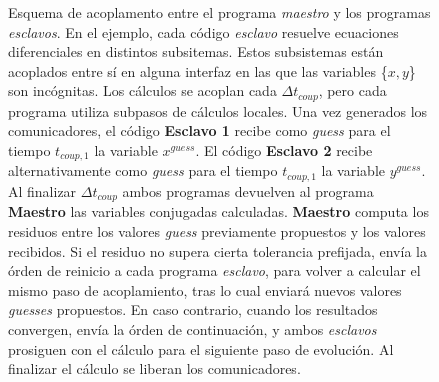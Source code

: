 \begin{figure}
\caption[Esquema de acoplamiento entre programas implementado]{Esquema de acoplamento entre el programa \textit{maestro} y los programas \textit{esclavos}.
En el ejemplo, cada código \textit{esclavo} resuelve ecuaciones diferenciales en distintos subsitemas.
Estos subsistemas están acoplados entre sí en alguna interfaz en las que las variables \{$x,y$\} son incógnitas.
Los cálculos se acoplan cada $\Delta t_{coup}$, pero cada programa utiliza subpasos de cálculos locales.
Una vez generados los comunicadores,
el código \textbf{Esclavo 1} recibe como \textit{guess} para el tiempo $t_{coup,1}$ la variable $x^{guess}$.
El código \textbf{Esclavo 2} recibe alternativamente como \textit{guess} para el tiempo $t_{coup,1}$ la variable $y^{guess}$.
Al finalizar $\Delta t_{coup}$ ambos programas devuelven al programa \textbf{Maestro} las variables conjugadas calculadas.
\textbf{Maestro} computa los residuos entre los valores \textit{guess} previamente propuestos y los valores recibidos.
Si el residuo no supera cierta tolerancia prefijada, envía la órden de reinicio a cada programa \textit{esclavo}, 
para volver a calcular el mismo paso de acoplamiento, tras lo cual enviará nuevos valores \textit{guesses} propuestos.
En caso contrario, cuando los resultados convergen, envía la órden de continuación, y ambos \textit{esclavos} prosiguen con el cálculo para el siguiente paso de evolución.
Al finalizar el cálculo se liberan los comunicadores.
}
\label{esquema-evolucion}
\end{figure}

